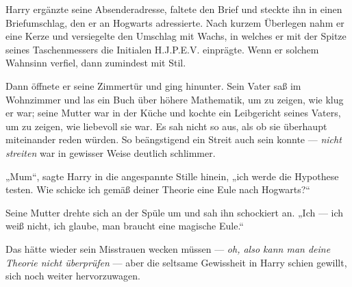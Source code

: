 Harry ergänzte seine Absenderadresse, faltete den Brief und steckte ihn in einen Briefumschlag, den er an Hogwarts adressierte. Nach kurzem Überlegen nahm er eine Kerze und versiegelte den Umschlag mit Wachs, in welches er mit der Spitze seines Taschenmessers die Initialen H.J.P.E.V\@. einprägte. Wenn er solchem Wahnsinn verfiel, dann zumindest mit Stil.

Dann öffnete er seine Zimmertür und ging hinunter. Sein Vater saß im Wohnzimmer und las ein Buch über höhere Mathematik, um zu zeigen, wie klug er war; seine Mutter war in der Küche und kochte ein Leibgericht seines Vaters, um zu zeigen, wie liebevoll sie war. Es sah nicht so aus, als ob sie überhaupt miteinander reden würden. So beängstigend ein Streit auch sein konnte — \emph{nicht streiten} war in gewisser Weise deutlich schlimmer.

„Mum“, sagte Harry in die angespannte Stille hinein, „ich werde die Hypothese testen. Wie schicke ich gemäß deiner Theorie eine Eule nach Hogwarts?“

Seine Mutter drehte sich an der Spüle um und sah ihn schockiert an.
„Ich — ich weiß nicht, ich glaube, man braucht eine magische Eule.“

Das hätte wieder sein Misstrauen wecken müssen — \emph{oh, also kann man deine Theorie nicht überprüfen} — aber die seltsame Gewissheit in Harry schien gewillt, sich noch weiter hervorzuwagen.

